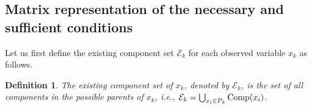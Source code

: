 \documentclass[12pt]{article}
\newtheorem{definition}{Definition}
\begin{document}
\subsection{Matrix representation of the necessary and sufficient conditions} \label{Matrix_representation}
Let us first define the existing component set $\mathcal{E}_k$ for each observed variable $x_k$ as follows.
\begin{definition} \label{def:existing_component}
The \emph{existing component set} of $x_k$, denoted by $\mathcal{E}_k$, is the set of all components in the possible parents of $x_k$, i.e.,
$\mathcal{E}_k = \bigcup_{x_i\in \mathcal{P}_k} {\rm{Comp}}(x_i)$.
\end{definition}
\end{document}
